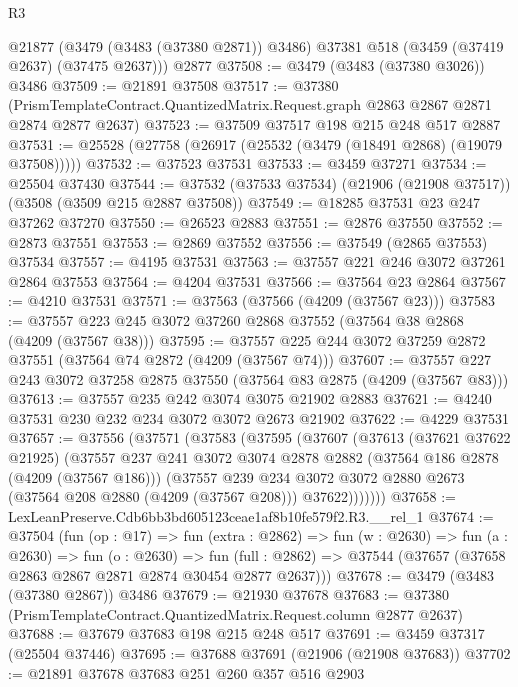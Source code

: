 \begin{lexlean}{R3}
\begin{coremodule}
    @21877 (@3479 (@3483 (@37380 @2871)) @3486) @37381 @518 (@3459 (@37419 @2637) (@37475 @2637)))
    @2877
@37508 := @3479 (@3483 (@37380 @3026)) @3486
@37509 := @21891 @37508
@37517 := @37380
    (PrismTemplateContract.QuantizedMatrix.Request.graph @2863 @2867 @2871 @2874 @2877 @2637)
@37523 := @37509 @37517 @198 @215 @248 @517 @2887
@37531 := @25528 (@27758 (@26917 (@25532 (@3479 (@18491 @2868) (@19079 @37508)))))
@37532 := @37523 @37531
@37533 := @3459 @37271
@37534 := @25504 @37430
@37544 := @37532 (@37533 @37534) (@21906 (@21908 @37517)) (@3508 (@3509 @215 @2887 @37508))
@37549 := @18285 @37531 @23 @247 @37262 @37270
@37550 := @26523 @2883
@37551 := @2876 @37550
@37552 := @2873 @37551
@37553 := @2869 @37552
@37556 := @37549 (@2865 @37553) @37534
@37557 := @4195 @37531
@37563 := @37557 @221 @246 @3072 @37261 @2864 @37553
@37564 := @4204 @37531
@37566 := @37564 @23 @2864
@37567 := @4210 @37531
@37571 := @37563 (@37566 (@4209 (@37567 @23)))
@37583 := @37557 @223 @245 @3072 @37260 @2868 @37552 (@37564 @38 @2868 (@4209 (@37567 @38)))
@37595 := @37557 @225 @244 @3072 @37259 @2872 @37551 (@37564 @74 @2872 (@4209 (@37567 @74)))
@37607 := @37557 @227 @243 @3072 @37258 @2875 @37550 (@37564 @83 @2875 (@4209 (@37567 @83)))
@37613 := @37557 @235 @242 @3074 @3075 @21902 @2883
@37621 := @4240 @37531 @230 @232 @234 @3072 @3072 @2673 @21902
@37622 := @4229 @37531
@37657 := @37556
    (@37571
      (@37583
        (@37595
          (@37607
            (@37613
              (@37621 @37622 @21925)
              (@37557
                @237
                @241
                @3072
                @3074
                @2878
                @2882
                (@37564 @186 @2878 (@4209 (@37567 @186)))
                (@37557
                  @239
                  @234
                  @3072
                  @3072
                  @2880
                  @2673
                  (@37564 @208 @2880 (@4209 (@37567 @208)))
                  @37622)))))))
@37658 := LexLeanPreserve.Cdb6bb3bd605123ceae1af8b10fe579f2.R3.__rel_1
@37674 := @37504
    (fun (op : @17) =>
    fun (extra : @2862) =>
    fun (w : @2630) =>
    fun (a : @2630) =>
    fun (o : @2630) =>
    fun (full : @2862) => @37544 (@37657 (@37658 @2863 @2867 @2871 @2874 @30454 @2877 @2637)))
@37678 := @3479 (@3483 (@37380 @2867)) @3486
@37679 := @21930 @37678
@37683 := @37380 (PrismTemplateContract.QuantizedMatrix.Request.column @2877 @2637)
@37688 := @37679 @37683 @198 @215 @248 @517
@37691 := @3459 @37317 (@25504 @37446)
@37695 := @37688 @37691 (@21906 (@21908 @37683))
@37702 := @21891 @37678 @37683 @251 @260 @357 @516 @2903

\end{coremodule}
\end{lexlean}
